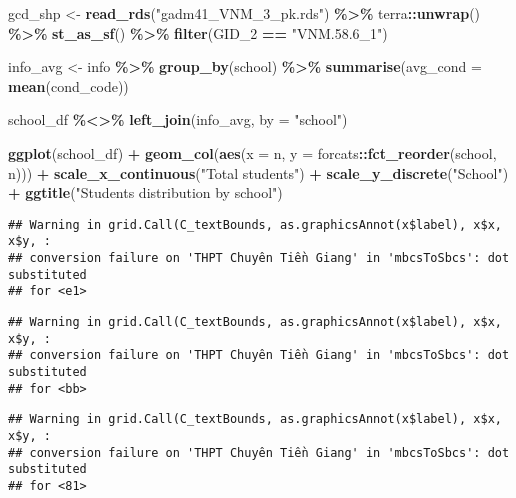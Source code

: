 \documentclass[
]{article}
\newenvironment{Shaded}{\begin{snugshade}}{\end{snugshade}}
\newcommand{\AttributeTok}[1]{\textcolor[rgb]{0.13,0.29,0.53}{#1}}
\newcommand{\FunctionTok}[1]{\textcolor[rgb]{0.13,0.29,0.53}{\textbf{#1}}}
\newcommand{\NormalTok}[1]{#1}
\newcommand{\OtherTok}[1]{\textcolor[rgb]{0.56,0.35,0.01}{#1}}
\newcommand{\SpecialCharTok}[1]{\textcolor[rgb]{0.81,0.36,0.00}{\textbf{#1}}}
\newcommand{\StringTok}[1]{\textcolor[rgb]{0.31,0.60,0.02}{#1}}
\begin{document}
\begin{Shaded}
\begin{Highlighting}[]
\NormalTok{gcd\_shp }\OtherTok{\textless{}{-}} \FunctionTok{read\_rds}\NormalTok{(}\StringTok{"gadm41\_VNM\_3\_pk.rds"}\NormalTok{) }\SpecialCharTok{\%\textgreater{}\%}
\NormalTok{  terra}\SpecialCharTok{::}\FunctionTok{unwrap}\NormalTok{() }\SpecialCharTok{\%\textgreater{}\%}
  \FunctionTok{st\_as\_sf}\NormalTok{() }\SpecialCharTok{\%\textgreater{}\%}
  \FunctionTok{filter}\NormalTok{(GID\_2 }\SpecialCharTok{==} \StringTok{"VNM.58.6\_1"}\NormalTok{)}

\NormalTok{info\_avg }\OtherTok{\textless{}{-}}\NormalTok{ info }\SpecialCharTok{\%\textgreater{}\%}
  \FunctionTok{group\_by}\NormalTok{(school) }\SpecialCharTok{\%\textgreater{}\%}
  \FunctionTok{summarise}\NormalTok{(}\AttributeTok{avg\_cond =} \FunctionTok{mean}\NormalTok{(cond\_code))}

\NormalTok{school\_df }\SpecialCharTok{\%\textless{}\textgreater{}\%} \FunctionTok{left\_join}\NormalTok{(info\_avg, }\AttributeTok{by =} \StringTok{"school"}\NormalTok{)}

\FunctionTok{ggplot}\NormalTok{(school\_df) }\SpecialCharTok{+} 
  \FunctionTok{geom\_col}\NormalTok{(}\FunctionTok{aes}\NormalTok{(}\AttributeTok{x =}\NormalTok{ n, }\AttributeTok{y =}\NormalTok{ forcats}\SpecialCharTok{::}\FunctionTok{fct\_reorder}\NormalTok{(school, n))) }\SpecialCharTok{+}
  \FunctionTok{scale\_x\_continuous}\NormalTok{(}\StringTok{"Total students"}\NormalTok{) }\SpecialCharTok{+}
  \FunctionTok{scale\_y\_discrete}\NormalTok{(}\StringTok{"School"}\NormalTok{) }\SpecialCharTok{+}
  \FunctionTok{ggtitle}\NormalTok{(}\StringTok{"Student\textquotesingle{}s distribution by school"}\NormalTok{)}
\end{Highlighting}
\end{Shaded}

\begin{verbatim}
## Warning in grid.Call(C_textBounds, as.graphicsAnnot(x$label), x$x, x$y, :
## conversion failure on 'THPT Chuyên Tiền Giang' in 'mbcsToSbcs': dot substituted
## for <e1>
\end{verbatim}

\begin{verbatim}
## Warning in grid.Call(C_textBounds, as.graphicsAnnot(x$label), x$x, x$y, :
## conversion failure on 'THPT Chuyên Tiền Giang' in 'mbcsToSbcs': dot substituted
## for <bb>
\end{verbatim}

\begin{verbatim}
## Warning in grid.Call(C_textBounds, as.graphicsAnnot(x$label), x$x, x$y, :
## conversion failure on 'THPT Chuyên Tiền Giang' in 'mbcsToSbcs': dot substituted
## for <81>
\end{verbatim}
\end{document}
